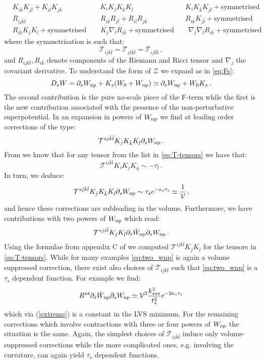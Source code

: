 \documentclass[11pt,a4paper]{article}
\newcommand{\be}{\begin{equation}}
\newcommand{\ee}{\end{equation}}
\newcommand\vo{{\mathcal{V}}}
\newcommand{\mc}{\mathcal}
\begin{document}
\be
\begin{aligned}\label{eq:T-tensors}
  & K_{i\bar{k}} K_{j\bar{l}} + K_{i\bar{l}} K_{j\bar{k}} \qquad\qquad\quad\,\,
  K_i K_j K_{\bar{k}} K_{\bar{l}} \qquad\qquad\qquad\quad\,\,
  K_i K_{\bar{k}} K_{j\bar{l}} + \text{symmetrised} \\
  & R_{ij\bar{k}\bar{l}} \qquad\qquad\qquad\qquad\qquad\,\,\,
  R_{i\bar{k}} R_{j\bar{l}} + R_{i\bar{l}} R_{j\bar{k}} \qquad\qquad\quad\,\,
  R_{i\bar{k}} K_{j\bar{l}} +  \text{symmetrised} \\
  & R_{i\bar{k}} K_j K_{\bar{l}} +  \text{symmetrised} \qquad
  K_j \nabla_{\bar{l}} R_{i\bar{k}} +  \text{symmetrised} \qquad
  \nabla_{j} \nabla_{\bar{l}} R_{i\bar{k}} +  \text{symmetrised} 
\end{aligned}
\ee
where the symmetrisation is such that:
\be
\mc{T}_{ij \bar{k}\bar{l}} = \mc{T}_{ji \bar{k}\bar{l}} = \mc{T}_{ij \bar{l}\bar{k}} \,,
\ee
and $R_{ij\bar{k}\bar{l}}, R_{i\bar{k}}$ denote components of the Riemann and Ricci tensor and $\nabla_{j}$ the covariant derivative. To understand the form of $\mc{Z}$ we expand as in \eqref{eq:Fs}:
\be
D_s W = \partial_s W_{\rm np} + K_s (W_0 + W_{\rm np}) \simeq \partial_s W_{\rm np} + W_0 K_s\,.
\ee
The second contribution is the pure no-scale piece of the F-term while the first is the new contribution associated with the presence of the non-perturbative superpotential. In an expansion in powers of $W_{\rm np}$ we find at leading order corrections of the type: 
\be
\mc{T}^{sj\bar{k}\bar{l}}  K_j K_{\bar{k}} K_{\bar{l}} \partial_s W_{\rm np} \,.
\ee
From \cite{Ciupke:2015msa} we know that for any tensor from the list in \eqref{eq:T-tensors} we have that:
\be
\mc{T}^{ij\bar{k}\bar{l}} K_i K_j K_{\bar{k}} \sim - \tau_l \,.
\ee
In turn, we deduce:
\be
\mc{T}^{sj\bar{k}\bar{l}}  K_j K_{\bar{k}} K_{\bar{l}} \partial_s W_{\rm np}  \sim \tau_s e^{-a_s \tau_s} \simeq \frac{1}{\vo} \,,
\ee
and hence these corrections are subleading in the volume. Furthermore, we have contributions with two powers of $W_{\rm np}$ which read:
\be
\label{eq:two_wnp}
\mc{T}^{sj \bar{s} \bar{l}}  K_{j} K_{\bar{l}} \partial_{\bar{s}} \bar{W}_{\rm np} \partial_s W_{\rm np} \,.
\ee
Using the formulae from appendix C of \cite{Ciupke:2015msa} we computed $\mc{T}^{ij\bar{k}\bar{l}}  K_{j} K_{\bar{l}}$ for the tensors in \eqref{eq:T-tensors}. While for many examples \eqref{eq:two_wnp} is again a volume suppressed correction, there exist also choices of $\mc{T}_{ij \bar{k}\bar{l}}$ such that \eqref{eq:two_wnp} is a $\tau_s$ dependent function. For example we find:
\be
 R^{s\bar{s}}  \partial_{\bar{s}} \bar{W}_{\rm np} \partial_s W_{\rm np} \simeq \vo^2 \frac{k_{sss}^2}{t_s^2} e^{-2 a_s \tau_s} 
\ee
which via (\ref{extreme}) is a constant in the LVS minimum. For the remaining corrections which involve contractions with three or four powers of $W_{\rm np}$ the situation is the same. Again, the simplest choices of $\mc{T}_{ij \bar{k}\bar{l}}$ induce only volume-suppressed corrections while the more complicated ones, e.g. involving the curvature, can again yield $\tau_s$ dependent functions.
\end{document}
